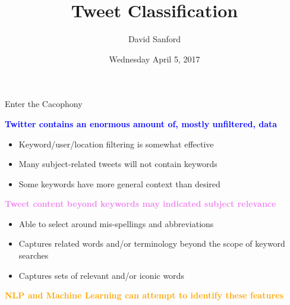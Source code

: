 \documentclass[aspectratio=169]{beamer}
\title{Tweet Classification}
\author{David Sanford}
\institute{Data Science Immersive\\ General Assembly}
\date{Wednesday April 5, 2017}
\begin{document}
\begin{frame}
  \titlepage
\end{frame}


\begin{frame}{Enter the Cacophony}

  \begin{center}
    \textcolor{blue}{\bf Twitter contains an enormous amount of,
      mostly unfiltered, data}
  \end{center}

  \begin{itemize}
  \item Keyword/user/location filtering is somewhat effective
  \item Many subject-related tweets will not contain keywords
  \item Some keywords have more general context than desired
  \end{itemize}

  \begin{center}
    \textcolor{violet}{\bf Tweet content beyond keywords may
      indicated subject relevance}
  \end{center}

  \begin{itemize}
  \item Able to select around mis-spellings and abbreviations
  \item Captures related words and/or terminology beyond the scope
    of keyword searches
  \item Captures sets of relevant and/or iconic words
  \end{itemize}

  \begin{center}
    \textcolor{orange}{\bf NLP and Machine Learning can attempt to
      identify these features}
  \end{center}

\end{frame}
\end{document}
